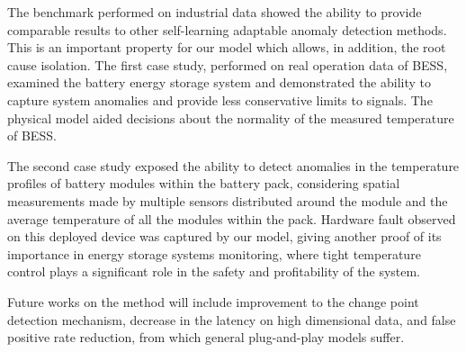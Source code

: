 The benchmark performed on industrial data showed the ability to provide comparable results to other self-learning adaptable anomaly detection methods. This is an important property for our model which allows, in addition, the root cause isolation.
The first case study, performed on real operation data of BESS, examined the battery energy storage system and demonstrated the ability to capture system anomalies and provide less conservative limits to signals. The physical model aided decisions about the normality of the measured temperature of BESS.

The second case study exposed the ability to detect anomalies in the temperature profiles of battery modules within the battery pack, considering spatial measurements made by multiple sensors distributed around the module and the average temperature of all the modules within the pack. Hardware fault observed on this deployed device was captured by our model, giving another proof of its importance in energy storage systems monitoring, where tight temperature control plays a significant role in the safety and profitability of the system.

Future works on the method will include improvement to the change point detection mechanism, decrease in the latency on high dimensional data, and false positive rate reduction, from which general plug-and-play models suffer.

